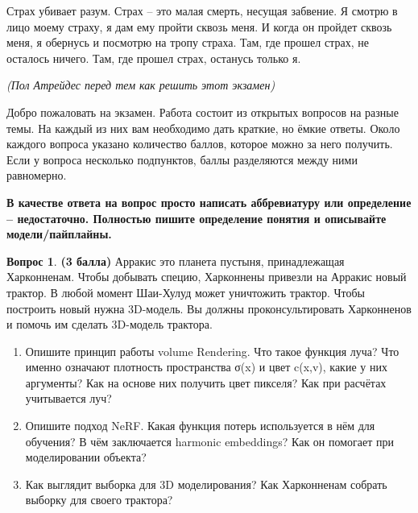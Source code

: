 \documentclass[12pt]{article}
\def \putyourname{\fbox{
    \begin{minipage}{42em}
      Фамилия, имя, номер группы:\vspace*{3ex}\par
      \noindent\dotfill\vspace{2mm}
    \end{minipage}
  }
}
\def \checktable{

    \vspace{5pt}
    Табличка для проверяющих работу:

\vspace{5pt}

    \begin{tabular}{|m{2cm}|m{1cm}|m{1cm}|m{1cm}|m{1cm}|m{1cm}|m{1cm}|m{1cm}|m{2cm}|}
\toprule
        Задачи & 1 & 2 & 3 & 4 & 5 & 6 & 7 & Итого \\
\midrule
        &  &  & & & & & & \\
        &  &  & & & & & & \\
 \bottomrule
\end{tabular}
}
\def \testtable{

\vspace{5pt}
    Внесите сюда ответы на тест:

\vspace{5pt}

\begin{tabular}{|m{2cm}|m{0.6cm}|m{0.6cm}|m{0.6cm}|m{0.6cm}|m{0.6cm}|m{0.6cm}|m{0.6cm}|m{0.6cm}|m{0.6cm}|m{0.6cm}|}
\toprule
        Вопрос & 1 &  2 & 3 & 4 & 5 & 6 & 7 & 8 & 9 & 10 \\
\midrule
        Ответ &  &  & & & & & & & & \\
 \bottomrule
\end{tabular}
}
\theoremstyle{definition}
\newtheorem{question}{Вопрос}
\begin{document}
\putyourname



\epigraph{Страх убивает разум. Страх – это малая смерть, несущая забвение. Я смотрю в лицо моему страху, я дам ему пройти сквозь меня. И когда он пройдет сквозь меня, я обернусь и посмотрю на тропу страха. Там, где прошел страх, не осталось ничего. Там, где прошел страх, останусь только я.}{\textit{(Пол Атрейдес перед тем как решить этот экзамен)}}

Добро пожаловать на экзамен. Работа состоит из открытых вопросов на разные темы. На каждый из них вам необходимо дать краткие, но ёмкие ответы. Около каждого вопроса указано количество баллов, которое можно за него получить. Если у вопроса несколько подпунктов, баллы разделяются между  ними равномерно.

\textbf{В качестве ответа на вопрос просто написать аббревиатуру или определение  -- недостаточно. Полностью пишите определение понятия и описывайте модели/пайплайны.}

\begin{question} \textbf{(3 балла)} \newline
    Арракис это планета пустыня, принадлежащая Харконненам. Чтобы добывать специю, Харконнены привезли на Арракис новый трактор. В любой момент Шаи-Хулуд может уничтожить трактор. Чтобы построить новый нужна 3D-модель. Вы должны проконсультировать Харконненов и помочь им сделать 3D-модель трактора.
    \begin{enumerate}
        \item  Опишите принцип работы volume Rendering. Что такое функция луча? Что именно означают плотность пространства σ(x) и цвет c(x,v), какие у них аргументы? Как на основе них получить цвет пикселя? Как при расчётах учитывается луч? 
        
        \item  Опишите подход NeRF. Какая функция потерь используется в  нём для обучения? В чём заключается harmonic embeddings? Как он помогает при моделировании объекта? 
        
        \item  Как выглядит выборка для 3D моделирования? Как Харконненам собрать выборку для своего трактора?
    \end{enumerate}
\end{question}
\end{document}
